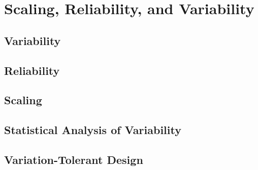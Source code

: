 \section{Scaling, Reliability, and Variability}   

\subsection{Variability}

\subsection{Reliability}

\subsection{Scaling}

\subsection{Statistical Analysis of Variability}

\subsection{Variation-Tolerant Design}
